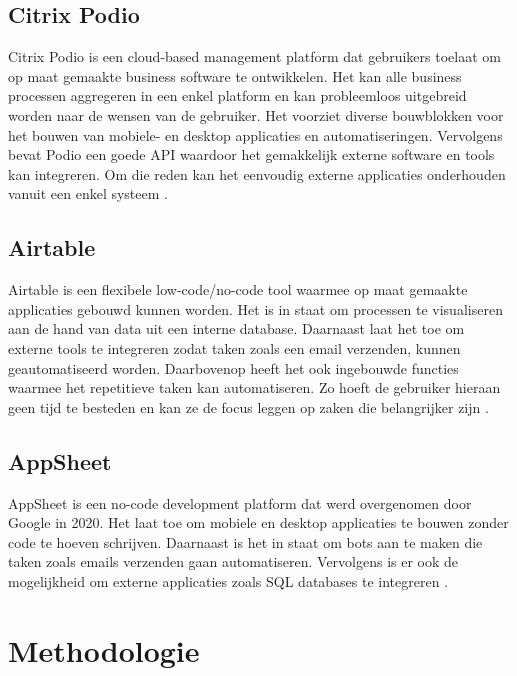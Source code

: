 \subsection{Citrix Podio}

Citrix Podio is een cloud-based management platform dat gebruikers toelaat om op maat gemaakte business software te ontwikkelen. Het kan alle business processen aggregeren in een enkel platform en kan probleemloos uitgebreid worden naar de wensen van de gebruiker. Het voorziet diverse bouwblokken voor het bouwen van mobiele- en desktop applicaties en automatiseringen. Vervolgens bevat Podio een goede API waardoor het gemakkelijk externe software en tools kan integreren. Om die reden kan het eenvoudig externe applicaties onderhouden vanuit een enkel systeem \autocite{Quivvy}.  


\subsection{Airtable}

Airtable is een flexibele low-code/no-code tool waarmee op maat gemaakte applicaties gebouwd kunnen worden. Het is in staat om processen te visualiseren aan de hand van data uit een interne database. Daarnaast laat het toe om externe tools te integreren zodat taken zoals een email verzenden, kunnen geautomatiseerd worden. Daarbovenop heeft het ook ingebouwde functies waarmee het repetitieve taken kan automatiseren. Zo hoeft de gebruiker hieraan geen tijd te besteden en kan ze de focus leggen op zaken die belangrijker zijn \autocite{Airtable}.

\subsection{AppSheet}

AppSheet is een no-code development platform dat werd overgenomen door Google in 2020. Het laat toe om mobiele en desktop applicaties te bouwen zonder code te hoeven schrijven. Daarnaast is het in staat om bots aan te maken die taken zoals emails verzenden gaan automatiseren. Vervolgens is er ook de mogelijkheid om externe applicaties zoals SQL databases te integreren \autocite{AppSheet2020}. 


\section{Methodologie}%
\label{sec:methodologie}

